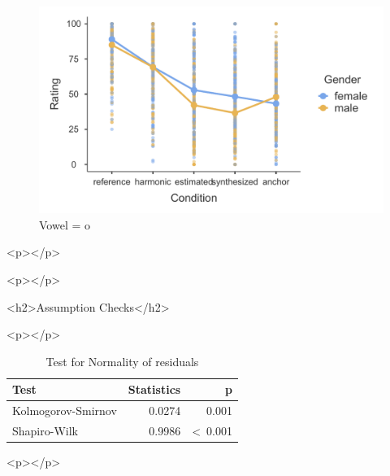 \documentclass[a4paper,man,hidelinks,floatsintext]{apa7}
\begin{document}
    \begin{figure}[htbp]\caption{Vowel = o}
\label{fig:Figure_3}
\centering
\includegraphics[width=\columnwidth]{figure_3.pdf}
\end{figure}
      
        <p></p>
      
    
      
      
    
      
        <p></p>
      
    <h2>Assumption Checks</h2>
      
        <p></p>
      
    
\begin{table}[!htbp]
\caption{Test for Normality of residuals}
\label{tab:Table_9}
\begin{adjustbox}{max size={\columnwidth}{\textheight}}
\centering
\begin{tabular}{lrr}
\hline
Test               & Statistics &               p \\
\hline
Kolmogorov-Smirnov &     0.0274 &           0.001 \\
Shapiro-Wilk       &     0.9986 & \textless~0.001 \\
\hline
\end{tabular}
\end{adjustbox}
\begin{tablenotes} {
\small
}
\end{tablenotes}
\end{table}
      
        <p></p>
      
\end{document}
